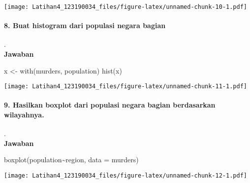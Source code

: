 \documentclass[
]{article}
\newenvironment{Shaded}{\begin{snugshade}}{\end{snugshade}}
\newcommand{\AttributeTok}[1]{\textcolor[rgb]{0.77,0.63,0.00}{#1}}
\newcommand{\FunctionTok}[1]{\textcolor[rgb]{0.00,0.00,0.00}{#1}}
\newcommand{\NormalTok}[1]{#1}
\newcommand{\OtherTok}[1]{\textcolor[rgb]{0.56,0.35,0.01}{#1}}
\newcommand{\SpecialCharTok}[1]{\textcolor[rgb]{0.00,0.00,0.00}{#1}}
\begin{document}
\texttt{[image: Latihan4\_123190034\_files/figure-latex/unnamed-chunk-10-1.pdf]}

\hypertarget{buat-histogram-dari-populasi-negara-bagian}{%
\paragraph{8. Buat histogram dari populasi negara
bagian}\label{buat-histogram-dari-populasi-negara-bagian}}

.\\
\textbf{Jawaban}

\begin{Shaded}
\begin{Highlighting}[]
\NormalTok{x }\OtherTok{\textless{}{-}} \FunctionTok{with}\NormalTok{(murders, population) }
\FunctionTok{hist}\NormalTok{(x)}
\end{Highlighting}
\end{Shaded}

\texttt{[image: Latihan4\_123190034\_files/figure-latex/unnamed-chunk-11-1.pdf]}

\hypertarget{hasilkan-boxplot-dari-populasi-negara-bagian-berdasarkan-wilayahnya.}{%
\paragraph{9. Hasilkan boxplot dari populasi negara bagian berdasarkan
wilayahnya.}\label{hasilkan-boxplot-dari-populasi-negara-bagian-berdasarkan-wilayahnya.}}

.\\
\textbf{Jawaban}

\begin{Shaded}
\begin{Highlighting}[]
\FunctionTok{boxplot}\NormalTok{(population}\SpecialCharTok{\textasciitilde{}}\NormalTok{region, }\AttributeTok{data =}\NormalTok{ murders) }
\end{Highlighting}
\end{Shaded}

\texttt{[image: Latihan4\_123190034\_files/figure-latex/unnamed-chunk-12-1.pdf]}
\end{document}

